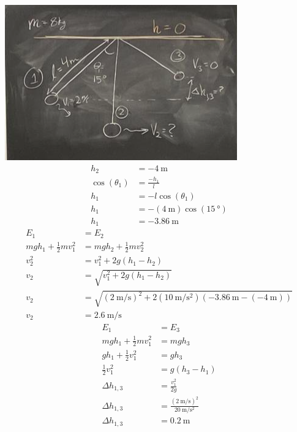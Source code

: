 \documentclass{article}
\begin{document}
\includegraphics[width = \linewidth]{image_2.png}
\begin{align*}
	h_2 & = -\SI{4}{\meter} \\
	\cos(\theta_1) & = \frac{-h_1}{l} \\
	h_1 & = -l\cos(\theta_1) \\
	h_1 & = -(\SI{4}{\meter})\cos(\SI{15}{\degree}) \\
	h_1 & = \SI{-3.86}{\meter}
\end{align*}
\begin{align*}
	E_1 & = E_2 \\
	mgh_1 + \frac{1}{2}mv_1^2 & = mgh_2 + \frac{1}{2}mv_2^2 \\
	v_2^2 & = v_1^2 + 2g(h_1 - h_2) \\
	v_2 & = \sqrt{v_1^2 + 2g(h_1 - h_2)} \\
	v_2 & = \sqrt{(\SI{2}{\meter \per \second})^2 + 2(\SI{10}{\meter \per \second \squared})(-\SI{3.86}{\meter} - (-\SI{4}{\meter}))} \\
	v_2 & = \SI{2.6}{\meter \per \second}
\end{align*}
\begin{align*}
	E_1 & = E_3 \\
	mgh_1 + \frac{1}{2}mv_1^2 & = mgh_3 \\
	gh_1 + \frac{1}{2}v_1^2 & = gh_3 \\
	\frac{1}{2}v_1^2 & = g(h_3 - h_1) \\
	\Delta h_{1, 3} & = \frac{v_1^2}{2g} \\
	\Delta h_{1, 3} & = \frac{(\SI{2}{\meter \per \second})^2}{\SI{20}{\meter \per \second \squared}} \\
	\Delta h_{1, 3} & = \SI{0.2}{\meter}
\end{align*}
\end{document}
